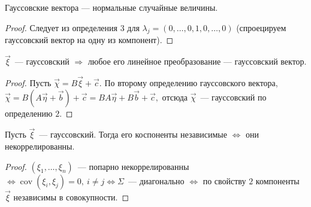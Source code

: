 	\begin{property}[Коши]
		Гауссовские вектора --- нормальные случайные величины.
		\begin{proof}
			Следует из определения \(3\) для \(\lambda_j = (0, \ldots, 0, 1, 0, \ldots, 0)\) (спроецируем гауссовский вектор на одну из компонент).
		\end{proof}
	\end{property}

	\begin{property}
		\(\vec{\xi}\)~--- гауссовский \(\Rightarrow\) любое его линейное преобразование --- гауссовский вектор.
		\begin{proof}
			Пусть \(\vec{\chi} = B\vec{\xi} + \vec{c}.\) По второму определению гауссовского вектора, \(\vec{\chi} = B(A\vec{\eta} + \vec{b}) + \vec{c} = BA\vec{\eta} + B\vec{b} + \vec{c},\) отсюда \(\vec{\chi}\)~--- гауссовский по определению \(2.\)
		\end{proof}
	\end{property}
	\begin{property}
		Пусть \(\vec{\xi}\)~--- гауссовский. Тогда его коспоненты независимые \(\Leftrightarrow\) они некоррелированны.
		\begin{proof}
			\((\xi_1, \ldots, \xi_n)\)~--- попарно некоррелированны \(\Leftrightarrow \operatorname{cov}(\xi_i, \xi_j) = 0, ~i \neq j \Leftrightarrow \Sigma\)~--- диагонально \(\Leftrightarrow\) по свойству \(2\) компоненты \(\vec{\xi}\) независимы в совокупности.
		\end{proof}
	\end{property}
